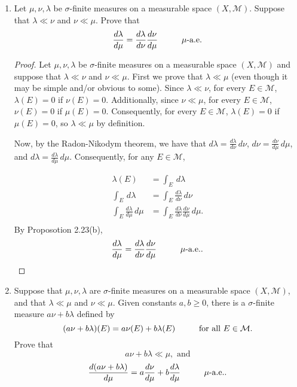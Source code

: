 \documentclass[11pt,oneside,english]{amsart}
\theoremstyle{definition}
\newcommand{\pspace}{\hspace{10mm}}
\newcommand{\dd}[2]{\frac{d{#1}}{d{#2}}}
\newcommand{\MC}[1]{\mathcal{#1}}
\begin{document}
\rightline{\today}



\vspace{5mm}
\begin{enumerate}
\itemsep7mm


\item Let $\mu,\nu,\lambda$ be $\sigma$-finite measures on a measurable space $(X,\MC{M})$. Suppose that $\lambda\ll\nu$ and $\nu\ll\mu$. Prove that
\[
\dd{\lambda}{\mu}=\dd{\lambda}{\nu}\dd{\nu}{\mu}\pspace\mu\text{-a.e.}
\]

\vspace{5mm}
\begin{proof}
Let $\mu,\nu,\lambda$ be $\sigma$-finite measures on a measurable space $(X,\MC{M})$ and suppose that $\lambda\ll\nu$ and $\nu\ll\mu$. First we prove that $\lambda\ll\mu$ (even though it may be simple and/or obvious to some). Since $\lambda\ll\nu$, for every $E\in\MC{M}$, $\lambda(E)=0$ if $\nu(E)=0$. Additionally, since $\nu\ll\mu$, for every $E\in\MC{M}$, $\nu(E)=0$ if $\mu(E)=0$. Consequently, for every $E\in\MC{M}$, $\lambda(E)=0$ if $\mu(E)=0$, so $\lambda\ll\mu$ by definition.

Now, by the Radon-Nikodym theorem, we have that $d\lambda=\dd{\lambda}{\nu}\,d\nu$, $d\nu=\dd{\nu}{\mu}\,d\mu$, and $d\lambda=\dd{\lambda}{\mu}\,d\mu$. Consequently, for any $E\in\MC{M}$,

\begin{align*}
\lambda(E)&=\int_E\,d\lambda\\[2mm]
\int_E\,d\lambda&=\int_E\dd{\lambda}{\nu}\,d\nu\\[2mm]
\int_E\dd{\lambda}{\mu}\,d\mu&=\int_E\dd{\lambda}{\nu}\dd{\nu}{\mu}\,d\mu.\\[2mm]
\end{align*}
By Proposotion 2.23(b), 
\[
\dd{\lambda}{\mu}=\dd{\lambda}{\nu}\dd{\nu}{\mu}\pspace\mu\text{-a.e.}.
\]
\end{proof}

\pagebreak

\item Suppose that $\mu,\nu,\lambda$ are $\sigma$-finite measures on a measurable space $(X,\MC{M})$, and that $\lambda\ll\mu$ and $\nu\ll\mu$. Given constants $a,b\geq0$, there is a $\sigma$-finite measure $a\nu+b\lambda$ defined by
\[
(a\nu+b\lambda)(E)=a\nu(E)+b\lambda(E)\pspace\text{for all }E\in\MC{M}.
\] 
Prove that 
\[             a \nu + b \lambda \ll \mu,\text{ and} \]
\[
\dd{(a\nu+b\lambda)}{\mu}=a\dd{\nu}{\mu}+b\dd{\lambda}{\mu}\pspace\mu\text{-a.e.}.
\]


\end{enumerate}
\end{document}
